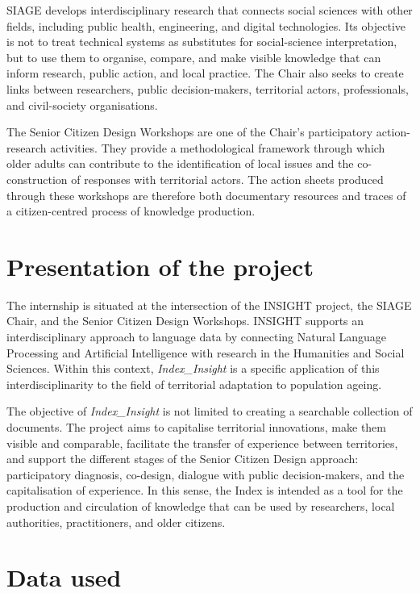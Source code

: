 SIAGE develops interdisciplinary research that connects social sciences with other
fields, including public health, engineering, and digital technologies. Its objective
is not to treat technical systems as substitutes for social-science interpretation,
but to use them to organise, compare, and make visible knowledge that can inform
research, public action, and local practice. The Chair also seeks to create links
between researchers, public decision-makers, territorial actors, professionals, and
civil-society organisations.

The Senior Citizen Design Workshops are one of the Chair's participatory
action-research activities. They provide a methodological framework through which
older adults can contribute to the identification of local issues and the
co-construction of responses with territorial actors. The action sheets produced
through these workshops are therefore both documentary resources and traces of a
citizen-centred process of knowledge production.

\section{Presentation of the project}

The internship is situated at the intersection of the INSIGHT project, the SIAGE
Chair, and the Senior Citizen Design Workshops. INSIGHT supports an
interdisciplinary approach to language data by connecting Natural Language
Processing and Artificial Intelligence with research in the Humanities and Social
Sciences. Within this context, \textit{Index\_Insight} is a specific application of
this interdisciplinarity to the field of territorial adaptation to population ageing.

The objective of \textit{Index\_Insight} is not limited to creating a searchable
collection of documents. The project aims to capitalise territorial innovations,
make them visible and comparable, facilitate the transfer of experience between
territories, and support the different stages of the Senior Citizen Design approach:
participatory diagnosis, co-design, dialogue with public decision-makers, and the
capitalisation of experience. In this sense, the Index is intended as a tool for the
production and circulation of knowledge that can be used by researchers, local
authorities, practitioners, and older citizens.

\section{Data used}

